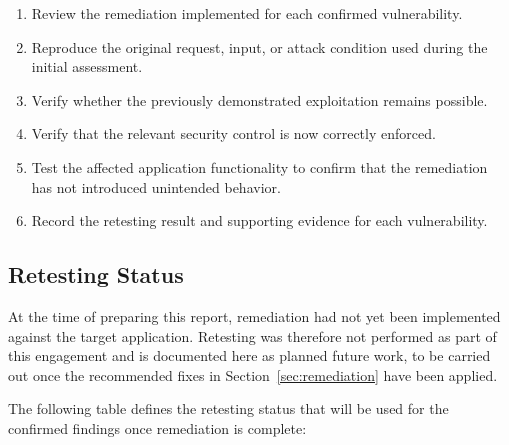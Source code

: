 \begin{enumerate}

    \item Review the remediation implemented for each confirmed
    vulnerability.

    \item Reproduce the original request, input, or attack condition
    used during the initial assessment.

    \item Verify whether the previously demonstrated exploitation
    remains possible.

    \item Verify that the relevant security control is now correctly
    enforced.

    \item Test the affected application functionality to confirm that
    the remediation has not introduced unintended behavior.

    \item Record the retesting result and supporting evidence for each
    vulnerability.

\end{enumerate}

\subsection*{Retesting Status}

At the time of preparing this report, remediation had not yet been
implemented against the target application. Retesting was therefore
not performed as part of this engagement and is documented here as
planned future work, to be carried out once the recommended fixes in
Section~\ref{sec:remediation} have been applied.

The following table defines the retesting status that will be used
for the confirmed findings once remediation is complete:

